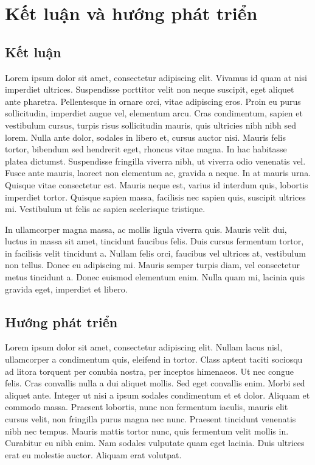 \def\baselinestretch{1}
\chapter{Kết luận và hướng phát triển}
\ifpdf
    \graphicspath{{Conclusions/ConclusionsFigs/PNG/}{Conclusions/ConclusionsFigs/PDF/}{Conclusions/ConclusionsFigs/}}
\else
    \graphicspath{{Conclusions/ConclusionsFigs/EPS/}{Conclusions/ConclusionsFigs/}}
\fi

\section{Kết luận}
Lorem ipsum dolor sit amet, consectetur adipiscing elit. Vivamus id quam at nisi imperdiet ultrices. Suspendisse porttitor velit non neque suscipit, eget aliquet ante pharetra. Pellentesque in ornare orci, vitae adipiscing eros. Proin eu purus sollicitudin, imperdiet augue vel, elementum arcu. Cras condimentum, sapien et vestibulum cursus, turpis risus sollicitudin mauris, quis ultricies nibh nibh sed lorem. Nulla ante dolor, sodales in libero et, cursus auctor nisi. Mauris felis tortor, bibendum sed hendrerit eget, rhoncus vitae magna. In hac habitasse platea dictumst. Suspendisse fringilla viverra nibh, ut viverra odio venenatis vel. Fusce ante mauris, laoreet non elementum ac, gravida a neque. In at mauris urna. Quisque vitae consectetur est. Mauris neque est, varius id interdum quis, lobortis imperdiet tortor. Quisque sapien massa, facilisis nec sapien quis, suscipit ultrices mi. Vestibulum ut felis ac sapien scelerisque tristique.

In ullamcorper magna massa, ac mollis ligula viverra quis. Mauris velit dui, luctus in massa sit amet, tincidunt faucibus felis. Duis cursus fermentum tortor, in facilisis velit tincidunt a. Nullam felis orci, faucibus vel ultrices at, vestibulum non tellus. Donec eu adipiscing mi. Mauris semper turpis diam, vel consectetur metus tincidunt a. Donec euismod elementum enim. Nulla quam mi, lacinia quis gravida eget, imperdiet et libero.

\section{Hướng phát triển}
Lorem ipsum dolor sit amet, consectetur adipiscing elit. Nullam lacus nisl, ullamcorper a condimentum quis, eleifend in tortor. Class aptent taciti sociosqu ad litora torquent per conubia nostra, per inceptos himenaeos. Ut nec congue felis. Cras convallis nulla a dui aliquet mollis. Sed eget convallis enim. Morbi sed aliquet ante. Integer ut nisi a ipsum sodales condimentum et et dolor. Aliquam et commodo massa. Praesent lobortis, nunc non fermentum iaculis, mauris elit cursus velit, non fringilla purus magna nec nunc. Praesent tincidunt venenatis nibh nec tempus. Mauris mattis tortor nunc, quis fermentum velit mollis in. Curabitur eu nibh enim. Nam sodales vulputate quam eget lacinia. Duis ultrices erat eu molestie auctor. Aliquam erat volutpat.






